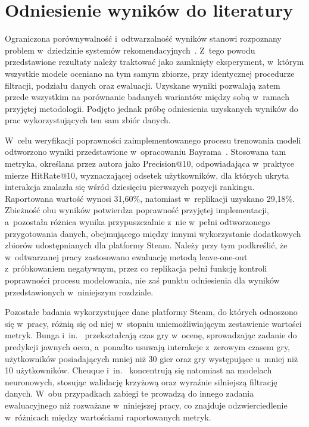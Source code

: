\section{Odniesienie wyników do literatury}
\label{sec:porownanie-literatura}

Ograniczona porównywalność i~odtwarzalność wyników stanowi rozpoznany problem w~dziedzinie systemów rekomendacyjnych~\cite{dacrema2019progress}. Z~tego powodu przedstawione rezultaty należy traktować jako zamknięty eksperyment, w~którym wszystkie modele oceniano na tym samym zbiorze, przy identycznej procedurze filtracji, podziału danych oraz ewaluacji. Uzyskane wyniki pozwalają zatem przede wszystkim na porównanie badanych wariantów między sobą w~ramach przyjętej metodologii. Podjęto jednak próbę odniesienia uzyskanych wyników do prac wykorzystujących ten sam zbiór danych.

W~celu weryfikacji poprawności zaimplementowanego procesu trenowania modeli odtworzono wyniki przedstawione w~opracowaniu Bayrama~\cite{bayram2021game}. Stosowana tam metryka, określana przez autora jako Precision@10, odpowiadająca w~praktyce mierze HitRate@10, wyznaczającej odsetek użytkowników, dla których ukryta interakcja znalazła się wśród dziesięciu pierwszych pozycji rankingu. Raportowana wartość wynosi 31,60\%, natomiast w~replikacji uzyskano 29,18\%. Zbieżność obu wyników potwierdza poprawność przyjętej implementacji, a~pozostała różnica wynika przypuszczalnie z~nie w~pełni odtworzonego przygotowania danych, obejmującego między innymi wykorzystanie dodatkowych zbiorów udostępnianych dla platformy Steam. Należy przy tym podkreślić, że w~odtwarzanej pracy zastosowano ewaluację metodą leave-one-out z~próbkowaniem negatywnym, przez co replikacja pełni funkcję kontroli poprawności procesu modelowania, nie zaś punktu odniesienia dla wyników przedstawionych w~niniejszym rozdziale.

Pozostałe badania wykorzystujące dane platformy Steam, do których odnoszono się w~pracy, różnią się od niej w~stopniu uniemożliwiającym zestawienie wartości metryk. Bunga i~in.~\cite{bunga2021implicit} przekształcają czas gry w~ocenę, sprowadzając zadanie do predykcji jawnych ocen, a~ponadto usuwają interakcje z~zerowym czasem gry, użytkowników posiadających mniej niż 30 gier oraz gry występujące u~mniej niż 10 użytkowników. Cheuque i~in.~\cite{cheuque2019steam} koncentrują się natomiast na modelach neuronowych, stosując walidację krzyżową oraz wyraźnie silniejszą filtrację danych. W~obu przypadkach zabiegi te prowadzą do innego zadania ewaluacyjnego niż rozważane w~niniejszej pracy, co znajduje odzwierciedlenie w~różnicach między wartościami raportowanych metryk.